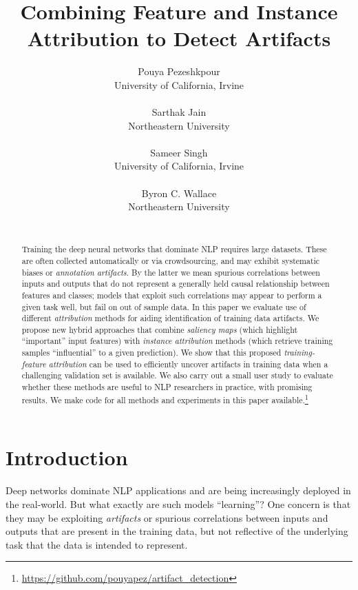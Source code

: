 \documentclass[11pt]{article}
\title{Combining Feature and Instance Attribution to Detect Artifacts}
\author{Pouya Pezeshkpour\\
  University of California, Irvine \\
  \email{pezeshkp@uci.edu} \\ \And
Sarthak Jain\\
  Northeastern University \\
  \email{jain.sar@northeastern.edu} \\
\AND
 Sameer Singh \\
  University of California, Irvine \\
  \email{sameer@uci.edu}\\
  \And
Byron C. Wallace \\
  Northeastern University \\
  \email{b.wallace@northeastern.edu}
\\}
\begin{document}
\maketitle



\begin{abstract}
\blfootnote{\textcolor{red!80!black}{Warning: This paper contains examples with texts that might be considered offensive.}}

Training the deep neural networks that dominate NLP requires large datasets.
These are often collected automatically or via crowdsourcing, %
and may exhibit systematic biases or \emph{annotation artifacts}.
By the latter we mean spurious correlations between inputs and outputs that do not represent a generally held causal relationship between features and classes; models that exploit such correlations may appear to perform a given task well, but fail on out of sample data. 
In this paper we evaluate use of different \emph{attribution} methods for aiding identification of training data artifacts. 
We propose new hybrid approaches that combine \emph{saliency maps} (which highlight ``important'' input features) with \emph{instance attribution} methods (which retrieve training samples ``influential'' to a given prediction). 
We show that this proposed \emph{training-feature attribution} can be used to efficiently uncover artifacts in training data when a challenging validation set is available.
We also carry out a small user study to evaluate whether %
these methods are useful to NLP researchers in practice, with promising results. 
We make code for all methods and experiments in this paper available.\footnote{\url{https://github.com/pouyapez/artifact_detection}}
\end{abstract}

\section{Introduction}

Deep networks dominate NLP applications %
and are being increasingly deployed in the real-world.
But what exactly are such models ``learning''?
One concern is that they may be exploiting \emph{artifacts} or spurious correlations between inputs and outputs that are present in the training data, but not reflective of the underlying task that the data is intended to represent. 
\end{document}
